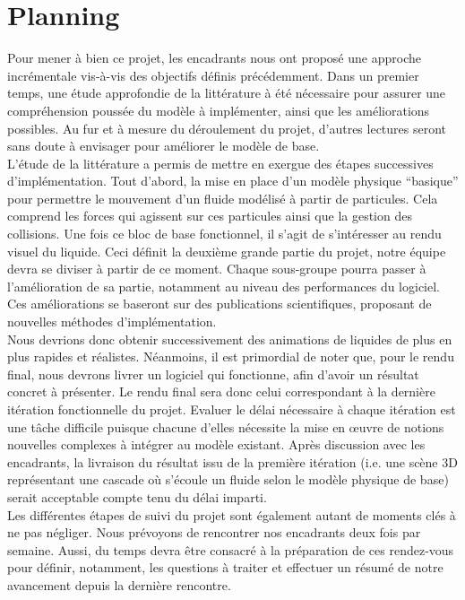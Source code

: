 \documentclass[a4paper,11pt]{article}
\begin{document}
\section{Planning}

Pour mener à bien ce projet, les encadrants nous ont proposé une approche incrémentale vis-à-vis des objectifs définis précédemment. Dans un premier temps, une étude approfondie de la littérature à été nécessaire pour assurer une compréhension poussée du modèle à implémenter, ainsi que les améliorations possibles. Au fur et à mesure du déroulement du projet, d'autres lectures seront sans doute à envisager pour améliorer le modèle de base.\\

L'étude de la littérature a permis de mettre en exergue des étapes successives d'implémentation. Tout d'abord, la mise en place d'un modèle physique ``basique'' pour permettre le mouvement d'un fluide modélisé à partir de particules. Cela comprend les forces qui agissent sur ces particules ainsi que la gestion des collisions. Une fois ce bloc de base fonctionnel, il s'agit de s'intéresser au rendu visuel du liquide. Ceci définit la deuxième grande partie du projet, notre équipe devra se diviser à partir de ce moment. Chaque sous-groupe pourra passer à l'amélioration de sa partie, notamment au niveau des performances du logiciel. Ces améliorations se baseront sur des publications scientifiques, proposant de nouvelles méthodes d'implémentation.\\

Nous devrions donc obtenir successivement des animations de liquides de plus en plus rapides et réalistes. Néanmoins, il est primordial de noter que, pour le rendu final, nous devrons livrer un logiciel qui fonctionne, afin d'avoir un résultat concret à présenter. Le rendu final sera donc celui correspondant à la dernière itération fonctionnelle du projet. Evaluer le délai nécessaire à chaque itération est une tâche difficile puisque chacune d'elles nécessite la mise en \oe{}uvre de notions nouvelles complexes à intégrer au modèle existant. Après discussion avec les encadrants, la livraison du résultat issu de la première itération (i.e. une scène 3D représentant une cascade où s'écoule un fluide selon le modèle physique de base) serait acceptable compte tenu du délai imparti.\\ 

Les différentes étapes de suivi du projet sont également autant de moments clés à ne pas négliger. Nous prévoyons de rencontrer nos encadrants deux fois par semaine. Aussi, du temps devra être consacré à la préparation de ces rendez-vous pour définir, notamment, les questions à traiter et effectuer un résumé de notre avancement depuis la dernière rencontre. \\
\end{document}
